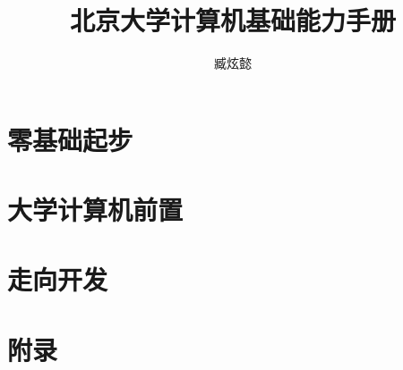 \documentclass[12pt, openany]{ctexbook}
\title{\Huge\textbf{北京大学计算机基础能力手册}}
\author{臧炫懿}
\begin{document}
\maketitle

\frontmatter



\mainmatter

\tableofcontents

\part{零基础起步}









\part{大学计算机前置}









\part{走向开发}









\part{附录}

\appendix











\backmatter


\end{document}
